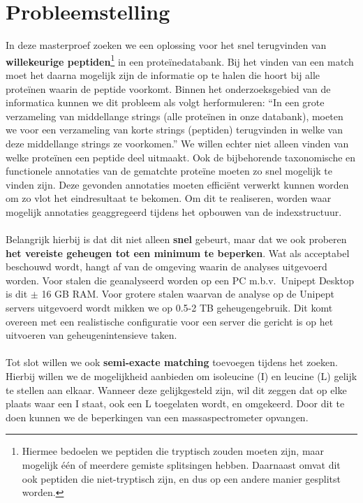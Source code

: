 \section{Probleemstelling}\label{sec:probleemstelling}
In deze masterproef zoeken we een oplossing voor het snel terugvinden van \textbf{willekeurige peptiden}\footnote{Hiermee bedoelen we peptiden die tryptisch zouden moeten zijn, maar mogelijk één of meerdere gemiste splitsingen hebben. Daarnaast omvat dit ook peptiden die niet-tryptisch zijn, en dus op een andere manier gesplitst worden.} in een proteïnedatabank.
Bij het vinden van een match moet het daarna mogelijk zijn de informatie op te halen die hoort bij alle proteïnen waarin de peptide voorkomt.
Binnen het onderzoeksgebied van de informatica kunnen we dit probleem als volgt herformuleren:
``In een grote verzameling van middellange strings (alle proteïnen in onze databank), moeten we voor een verzameling van korte strings (peptiden) terugvinden in welke van deze middellange strings ze voorkomen.''
We willen echter niet alleen vinden van welke proteïnen een peptide deel uitmaakt.
Ook de bijbehorende taxonomische en functionele annotaties van de gematchte proteïne moeten zo snel mogelijk te vinden zijn.
Deze gevonden annotaties moeten efficiënt verwerkt kunnen worden om zo vlot het eindresultaat te bekomen.
Om dit te realiseren, worden waar mogelijk annotaties geaggregeerd tijdens het opbouwen van de indexstructuur.
\\ \\
Belangrijk hierbij is dat dit niet alleen \textbf{snel} gebeurt, maar dat we ook proberen \textbf{het vereiste geheugen tot een minimum te beperken}.
Wat als acceptabel beschouwd wordt, hangt af van de omgeving waarin de analyses uitgevoerd worden.
Voor stalen die geanalyseerd worden op een PC m.b.v.~Unipept Desktop is dit $\pm$ 16 GB RAM\@.
Voor grotere stalen waarvan de analyse op de Unipept servers uitgevoerd wordt mikken we op 0.5-2 TB geheugengebruik.
Dit komt overeen met een realistische configuratie voor een server die gericht is op het uitvoeren van geheugenintensieve taken.
\\ \\
Tot slot willen we ook \textbf{semi-exacte matching} toevoegen tijdens het zoeken.
Hierbij willen we de mogelijkheid aanbieden om isoleucine (I) en leucine (L) gelijk te stellen aan elkaar.
Wanneer deze gelijkgesteld zijn, wil dit zeggen dat op elke plaats waar een I staat, ook een L toegelaten wordt, en omgekeerd.
Door dit te doen kunnen we de beperkingen van een massaspectrometer opvangen.
